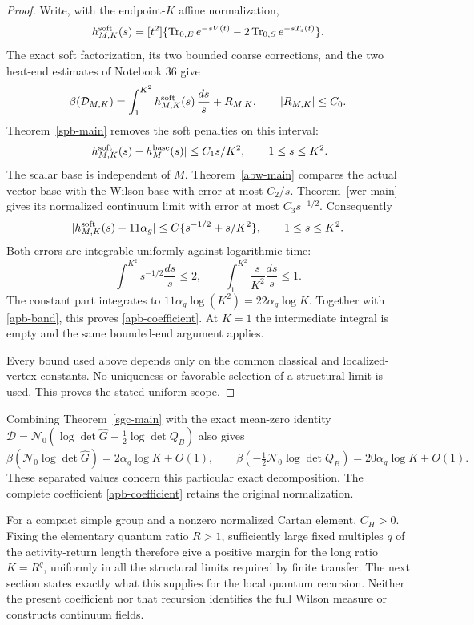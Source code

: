\begin{proof}
Write, with the endpoint-\(K\) affine normalization,
\[
 h^{\rm soft}_{M,K}(s)
  =[t^2]\{\operatorname{Tr}_{0,E}e^{-sV(t)}
                   -2\operatorname{Tr}_{0,S}e^{-sT_s(t)}\}.
\]
The exact soft factorization, its two bounded coarse corrections,
and the two heat-end estimates of Notebook 36 give
\begin{equation}
 \beta(\mathcal D_{M,K})
       =\int_1^{K^2}h^{\rm soft}_{M,K}(s)\,\frac{ds}{s}+R_{M,K},
 \qquad |R_{M,K}|\le C_0.
 \label{apb-band}
\end{equation}
Theorem~\ref{spb-main} removes the soft penalties on this interval:
\[
 |h^{\rm soft}_{M,K}(s)-h^{\rm base}_M(s)|
       \le C_1s/K^2,\qquad 1\le s\le K^2.
\]
The scalar base is independent of \(M\).
Theorem~\ref{abw-main} compares the actual vector base with the
Wilson base with error at most \(C_2/s\). Theorem~\ref{wcr-main}
gives its normalized continuum limit with error at most
\(C_3s^{-1/2}\). Consequently
\begin{equation}
 |h^{\rm soft}_{M,K}(s)-11\alpha_g|
       \le C\{s^{-1/2}+s/K^2\},
       \qquad 1\le s\le K^2.
 \label{apb-plateau}
\end{equation}
Both errors are integrable uniformly against logarithmic time:
\[
 \int_1^{K^2}s^{-1/2}\frac{ds}{s}\le2,\qquad
 \int_1^{K^2}\frac{s}{K^2}\frac{ds}{s}\le1.
\]
The constant part integrates to
\(11\alpha_g\log(K^2)=22\alpha_g\log K\).
Together with \eqref{apb-band}, this proves
\eqref{apb-coefficient}. At \(K=1\) the intermediate integral is
empty and the same bounded-end argument applies.

Every bound used above depends only on the common classical and
localized-vertex constants. No uniqueness or favorable selection of
a structural limit is used. This proves the stated uniform scope.
\end{proof}

Combining Theorem~\ref{sgc-main} with the exact mean-zero identity
\(\mathcal D=\mathcal N_0(\log\det\widehat G
-\tfrac12\log\det Q_B)\) also gives
\[
 \beta(\mathcal N_0\log\det\widehat G)
       =2\alpha_g\log K+O(1),\qquad
 \beta(-\tfrac12\mathcal N_0\log\det Q_B)
       =20\alpha_g\log K+O(1).
\]
These separated values concern this particular exact decomposition.
The complete coefficient \eqref{apb-coefficient} retains the original
normalization.

For a compact simple group and a nonzero normalized Cartan element,
\(C_H>0\). Fixing the elementary quantum ratio \(R>1\), sufficiently
large fixed multiples \(q\) of the activity-return length therefore
give a positive margin for the long ratio \(K=R^q\), uniformly in
all the structural limits required by finite transfer. The next
section states exactly what this supplies for the local quantum
recursion. Neither the present coefficient nor that recursion
identifies the full Wilson measure or constructs continuum fields.
